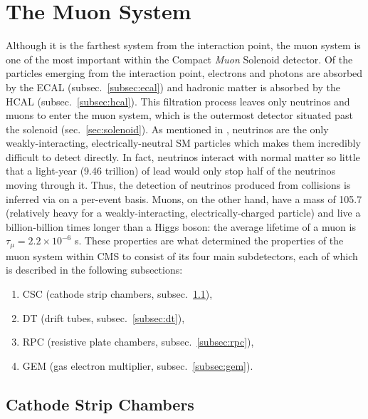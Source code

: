 \section{The Muon System}
\label{sec:muon_sys}

Although it is the farthest system from the interaction point, the muon system is one of the most important within the Compact \emph{Muon} Solenoid detector.
Of the particles emerging from the interaction point, electrons and photons are absorbed by the ECAL (subsec.~\ref{subsec:ecal}) and hadronic matter is absorbed by the HCAL (subsec.~\ref{subsec:hcal}).
This filtration process leaves only neutrinos and muons to enter the muon system, which is the outermost detector situated past the solenoid (sec.~\ref{sec:solenoid}).
As mentioned in
, neutrinos are the only weakly-interacting, electrically-neutral SM particles which makes them incredibly difficult to detect directly.
In fact, neutrinos interact with normal matter so little that a light-year (9.46 trillion\Km) of lead would only stop half of the neutrinos moving through it.
Thus, the detection of neutrinos produced from \pp collisions is inferred via \MET on a per-event basis.
Muons, on the other hand, have a mass of 105.7 \MeV (relatively heavy for a weakly-interacting, electrically-charged particle) and live a billion-billion times longer than a Higgs boson: the average lifetime of a muon is $\tau_{\mu} = 2.2 \times 10^{-6}$ s.
These properties are what determined the properties of the muon system within CMS to consist of its four main subdetectors, each of which is described in the following subsections:
\begin{enumerate}
    \item CSC (cathode strip chambers, subsec.~\ref{subsec:csc}),
    \item DT (drift tubes, subsec.~\ref{subsec:dt}),
    \item RPC (resistive plate chambers, subsec.~\ref{subsec:rpc}),
    \item GEM (gas electron multiplier, subsec.~\ref{subsec:gem}).
\end{enumerate}

\subsection{Cathode Strip Chambers}
\label{subsec:csc}

